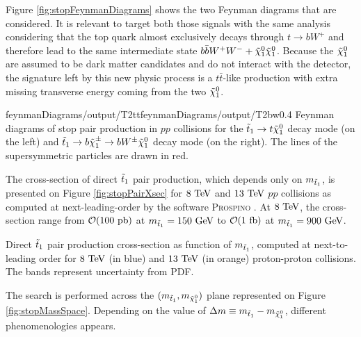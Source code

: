         Figure \ref{fig:stopFeynmanDiagrams} shows the two Feynman diagrams that are
        considered. It is relevant to target both those signals with the same analysis
        considering that the top quark almost exclusively decays through $t \rightarrow
        b W^+$ and therefore lead to the same intermediate state $b \bar{b} W^+ W^- +
        \tilde{\chi}_1^0 \tilde{\chi}_1^0$. Because the $\tilde{\chi}_1^0$ are assumed to be dark
        matter candidates and do not interact with the detector, the signature left by
        this new physic process is a $t\bar{t}$-like production with extra missing
        transverse energy coming from the two $\tilde{\chi}_1^0$.

                         {feynmanDiagrams/output/T2tt}{feynmanDiagrams/output/T2bw}{0.4}
                         {Feynman diagrams of stop pair production in $pp$ collisions for the
                         $\tilde{t}_1 \rightarrow t \tilde{\chi}_1^0$ decay mode (on the left) and
                         $\tilde{t}_1 \rightarrow b \tilde{\chi}_1^\pm \rightarrow b W^{\pm} \tilde{\chi}_1^0$ decay mode
                         (on the right). The lines of the supersymmetric particles are drawn in red.}

        The cross-section of direct $\tilde{t}_1$ pair production, which depends only on $m_{\tilde{t}_1}$, is presented
        on Figure \ref{fig:stopPairXsec} for $8~\text{TeV}$ and $13~\text{TeV}$ $pp$ collisions as computed at next-leading-order
        by the software \textsc{Prospino} . At $8~\text{TeV}$, the cross-section range from $\mathcal{O}(100~\text{pb})$
        at $m_{\tilde{t}_1} = 150~\text{GeV}$ to $\mathcal{O}(1~\text{fb})$ at $m_{\tilde{t}_1} = 900 ~\text{GeV}$.

        {Direct $\tilde{t}_1$ pair production cross-section as function of $m_{\tilde{t}_1}$, computed at next-to-leading order
        for $8~\text{TeV}$ (in blue) and $13~\text{TeV}$ (in orange) proton-proton collisions. The bands represent uncertainty from PDF.}

        The search is performed across the $(m_{\tilde{t}_1},m_{\tilde{\chi}_1^0})$ plane
        represented on Figure \ref{fig:stopMassSpace}. Depending on the value of
        $\Delta m \equiv m_{\tilde{t}_1} - m_{\tilde{\chi}_1^0}$, different phenomenologies
        appears.

